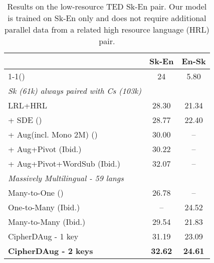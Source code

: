 \documentclass[11pt]{article}
\begin{document}
\begin{table}[!htb]
\footnotesize
\centering
\begin{tabular}{lcc}
\toprule
\textbf{ }           & \textbf{Sk-En} & \textbf{En-Sk} \\ \midrule
1-1(\citeauthor{neubig-hu-2018-rapid, aharoni-etal-2019-massively})    & 24             & 5.80            \\
\hline
\scriptsize{\emph{Sk (61k) always paired with Cs (103k)}} & & \\
LRL+HRL             & 28.30           & 21.34          \\
+ SDE (\citeauthor{wang2018multilingual, gao-etal-2020-improving})              & 28.77          & 22.40           \\ 
+ Aug(incl. Mono 2M) (\citeauthor{xia-etal-2019-generalized})    & 30.00  & --           \\
+ Aug+Pivot (Ibid.)             & 30.22   & --           \\
+ Aug+Pivot+WordSub (Ibid.)   & 32.07   & --           \\\midrule
\scriptsize{\emph{Massively Multilingual - 59 langs}} & & \\
Many-to-One (\citeauthor{aharoni-etal-2019-massively})        & 26.78          & --             \\
One-to-Many (Ibid.)        & --             & 24.52          \\
Many-to-Many (Ibid.)       & 29.54          & 21.83          \\ \midrule
CipherDAug - 1 key & 31.19 & 23.09 \\
\textbf{CipherDAug - 2 keys} & \textbf{32.62} & \textbf{24.61} \\
\bottomrule
\end{tabular}
\caption{Results on the low-resource TED \cite{qi-etal-2018-pre} Sk-En pair. Our model is trained on Sk-En only and does not require additional parallel data from a related high resource language (HRL) pair. 
}
\label{tab:lrl}
\vspace{-2em}
\end{table}
\end{document}
